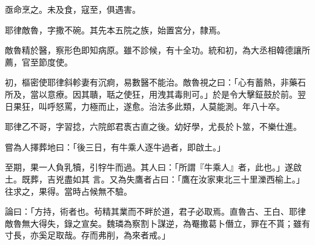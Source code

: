 \begin{pinyinscope}
 亟命烹之。未及食，寇至，俱遇害。



 耶律敵魯，字撒不碗。其先本五院之族，始置宮分，隸焉。



 敵魯精於醫，察形色即知病原。雖不診候，有十全功。統和初，為大丞相韓德讓所薦，官至節度使。



 初，樞密使耶律斜軫妻有沉痾，易數醫不能治。敵魯視之曰：「心有蓄熱，非藥石所及，當以意療。因其聵，聒之使狂，用洩其毒則可。」於是令大擊鉦鼓於前。翌日果狂，叫呼怒罵，力極而止，遂愈。治法多此類，人莫能測。年八十卒。



 耶律乙不哥，字習捻，六院郎君褭古直之後。幼好學，尤長於卜筮，不樂仕進。



 嘗為人擇葬地曰：「後三日，有牛乘人逐牛過者，即啟土。」



 至期，果一人負乳犢，引牸牛而過。其人曰：「所謂『牛乘人』者，此也。」遂啟土。既葬，吉兇盡如其
 言。又為失鷹者占曰：「鷹在汝家東北三十里濼西榆上。」往求之，果得。當時占候無不驗。



 論曰：「方持，術者也。茍精其業而不畔於道，君子必取焉。直魯古、王白、耶律敵魯無大得失，錄之宣矣。魏璘為察割卜謀逆，為罨撒葛卜僭立，罪在不貰；雖有寸長，亦奚足取哉。存而弗削，為來者戒。」



\end{pinyinscope}
